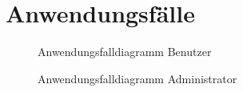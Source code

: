\newpage
\section{Anwendungsfälle}

\begin{figure}[H]
    \caption{Anwendungsfalldiagramm Benutzer}
\end{figure}

\begin{figure}[H]
    \caption{Anwendungsfalldiagramm Administrator}
\end{figure}